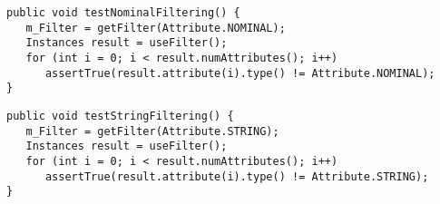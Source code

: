\begin{lstlisting}
public void testNominalFiltering() {
   m_Filter = getFilter(Attribute.NOMINAL);
   Instances result = useFilter();
   for (int i = 0; i < result.numAttributes(); i++)
      assertTrue(result.attribute(i).type() != Attribute.NOMINAL);
}
\end{lstlisting}
\begin{lstlisting}
public void testStringFiltering() {
   m_Filter = getFilter(Attribute.STRING);
   Instances result = useFilter();
   for (int i = 0; i < result.numAttributes(); i++)
      assertTrue(result.attribute(i).type() != Attribute.STRING);
}
\end{lstlisting}

